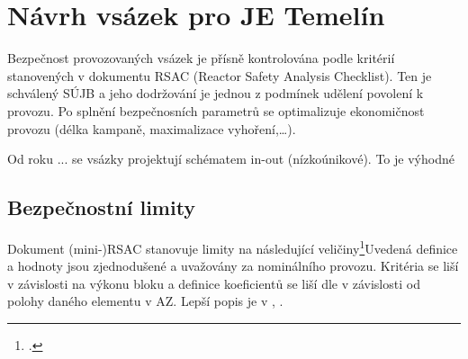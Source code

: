 \chapter{Návrh vsázek pro JE Temelín}
Bezpečnost provozovaných vsázek je přísně kontrolována podle kritérií stanovených v dokumentu RSAC (Reactor Safety Analysis Checklist). Ten je schválený SÚJB a jeho 
dodržování je jednou z podmínek udělení povolení k provozu. Po splnění bezpečnosních parametrů se optimalizuje ekonomičnost provozu (délka kampaně, maximalizace 
vyhoření,\dots).

Od roku ...%
se vsázky projektují schématem in-out (nízkoúnikové). To je výhodné 

\section{Bezpečnostní limity}
Dokument (mini-)RSAC stanovuje limity na následující veličiny\footnote{.}{Uvedená definice a hodnoty jsou zjednodušené a uvažovány za nominálního provozu. Kritéria se liší v závislosti na výkonu bloku a definice koeficientů se liší dle v závislosti od polohy daného elementu v AZ. Lepší popis je v \cite{ulmanova-bc}, \cite{ulmanova-ing}.}
